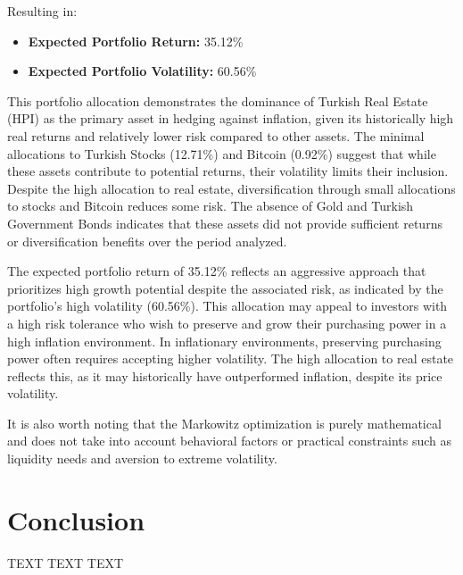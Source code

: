 \documentclass[
]{article}
\begin{document}
Resulting in:
\begin{itemize}
  \item \textbf{Expected Portfolio Return:} 35.12\%
  \item \textbf{Expected Portfolio Volatility:} 60.56\%
\end{itemize}

This portfolio allocation demonstrates the dominance of Turkish Real Estate (HPI) as the primary asset in hedging against inflation, given its historically high real returns and relatively lower risk compared to other assets. The minimal allocations to Turkish Stocks (12.71\%) and Bitcoin (0.92\%) suggest that while these assets contribute to potential returns, their volatility limits their inclusion. Despite the high allocation to real estate, diversification through small allocations to stocks and Bitcoin reduces some risk. The absence of Gold and Turkish Government Bonds indicates that these assets did not provide sufficient returns or diversification benefits over the period analyzed.

The expected portfolio return of 35.12\% reflects an aggressive approach that prioritizes high growth potential despite the associated risk, as indicated by the portfolio’s high volatility (60.56\%). This allocation may appeal to investors with a high risk tolerance who wish to preserve and grow their purchasing power in a high inflation environment. In inflationary environments, preserving purchasing power often requires accepting higher volatility. The high allocation to real estate reflects this, as it may historically have outperformed inflation, despite its price volatility.

It is also worth noting that the Markowitz optimization is purely mathematical and does not take into account behavioral factors or practical constraints such as liquidity needs and aversion to extreme volatility. 

\section{Conclusion}\label{conclusion}

TEXT TEXT TEXT

\pagebreak



\end{document}

